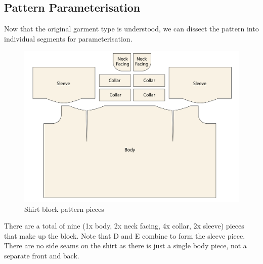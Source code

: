 \subsection{Pattern Parameterisation}
Now that the original garment type is understood, we can dissect the pattern into individual segments for parameterisation.
\begin{figure} [htb] 
    \centering 
    \includegraphics[width = \textwidth]{Images/originalpattern_pieces.png} 
    \caption{Shirt block pattern pieces}
\end{figure}
There are a total of nine (1x body, 2x neck facing, 4x collar, 2x sleeve) pieces that make up the block. Note that D and E combine to form the sleeve piece. There are no side seams on the shirt as there is just a single body piece, not a separate front and back.

